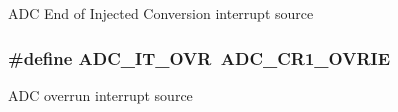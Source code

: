 A\-D\-C End of Injected Conversion interrupt source \hypertarget{group___a_d_c__interrupts__definition_gac3852b7789860e0ea79b82115ab877a0}{
\subsubsection[{A\-D\-C\-\_\-\-I\-T\-\_\-\-O\-V\-R}]{\setlength{\rightskip}{0pt plus 5cm}\#define A\-D\-C\-\_\-\-I\-T\-\_\-\-O\-V\-R~{\bf A\-D\-C\-\_\-\-C\-R1\-\_\-\-O\-V\-R\-I\-E}}}\label{group___a_d_c__interrupts__definition_gac3852b7789860e0ea79b82115ab877a0}
A\-D\-C overrun interrupt source 